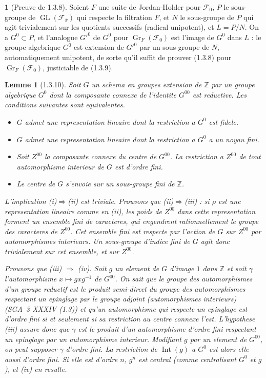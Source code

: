 \documentclass[12pt,a4paper]{article}
\theoremstyle{plain}
\newtheorem{lemme}[theorem]{Lemme}
\theoremstyle{definition}
\theoremstyle{definition}
\newtheorem{para}{}[section]
\theoremstyle{remark}
\DeclareMathOperator{\GL}{GL}
\DeclareMathOperator{\Gr}{Gr}
\DeclareMathOperator{\Int}{Int}
\begin{document}
\begin{para}[Preuve de 1.3.8]
Soient $F$ une suite de Jordan-Holder pour $\mathscr{F}_0$, $P$ le sous-groupe de $\GL(\mathscr{F}_{\overline{x}})$ qui respecte la filtration $F$, et $N$ le sous-groupe de $P$ qui agit trivialement sur les quotients successifs (radical unipotent), et $L = P/N$. On a $G^0 \subset P$, et l'analogue $G'^0$ de $G^0$ pour $\Gr_F(\mathscr{F}_0)$ est l'image de $G^0$ dans $L$ : le groupe algebrique $G^0$ est extension de $G'^0$ par un sous-groupe de $N$, automatiquement unipotent, de sorte qu'il suffit de prouver (1.3.8) pour $\Gr_F(\mathscr{F}_0)$, justiciable de (1.3.9).
\end{para}

\begin{lemme}[1.3.10]
Soit $G$ un schema en groupes extension de $\mathbb{Z}$ par un groupe algebrique $G^0$ dont la composante connexe de l'identite $G^{00}$ est reductive. Les conditions suivantes sont equivalentes.
\begin{itemize}[nosep]
\item[(i)] $G$ admet une representation lineaire dont la restriction a $G^0$ est fidele.
\item[(ii)] $G$ admet une representation lineaire dont la restriction a $G^0$ a un noyau fini.
\item[(iii)] Soit $Z^{00}$ la composante connexe du centre de $G^{00}$. La restriction a $Z^{00}$ de tout automorphisme interieur de $G$ est d'ordre fini.
\item[(iv)] Le centre de $G$ s'envoie sur un sous-groupe fini de $\mathbb{Z}$.
\end{itemize}

L'implication (i)$\Rightarrow$(ii) est triviale. Prouvons que (ii)$\Rightarrow$(iii) : si $\rho$ est une representation lineaire comme en (ii), les poids de $Z^{00}$ dans cette representation forment un ensemble fini de caracteres, qui engendrent rationnellement le groupe des caracteres de $Z^{00}$. Cet ensemble fini est respecte par l'action de $G$ sur $Z^{00}$ par automorphismes interieurs. Un sous-groupe d'indice fini de $G$ agit donc trivialement sur cet ensemble, et sur $Z^{00}$.

Prouvons que (iii) $\Rightarrow$ (iv). Soit $g$ un element de $G$ d'image $1$ dans $\mathbb{Z}$ et soit $\gamma$ l'automorphisme $x \mapsto gxg^{-1}$ de $G^{00}$. On sait que le groupe des automorphismes d'un groupe reductif est le produit semi-direct du groupe des automorphismes respectant un epinglage par le groupe adjoint (automorphismes interieurs) (SGA~3 XXXIV (1.3)) et qu'un automorphisme qui respecte un epinglage est d'ordre fini si et seulement si sa restriction au centre connexe l'est. L'hypothese (iii) assure donc que $\gamma$ est le produit d'un automorphisme d'ordre fini respectant un epinglage par un automorphisme interieur. Modifiant $g$ par un element de $G^{00}$, on peut supposer $\gamma$ d'ordre fini. La restriction de $\Int(g)$ a $G^0$ est alors elle aussi d'ordre fini. Si elle est d'ordre $n$, $g^n$ est central (comme centralisant $G^0$ et $g$), et (iv) en resulte.


\end{lemme}
\end{document}
